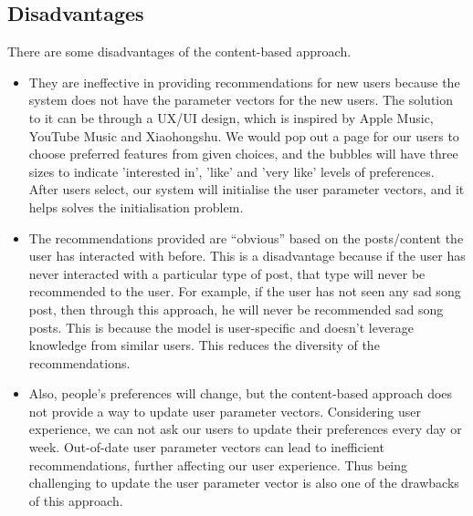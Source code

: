 \subsection*{Disadvantages}
There are some disadvantages of the content-based approach.
\begin{itemize}
\item They are ineffective in providing recommendations for new users because the system does not have the parameter vectors for the new users. 
The solution to it can be through a UX/UI design, which is inspired by Apple Music, YouTube Music and Xiaohongshu. We would pop out a page for our users to choose preferred features from given choices, and the bubbles will have three sizes to indicate 'interested in', 'like' and 'very like' levels of preferences. After users select, our system will initialise the user parameter vectors, and it helps solves the initialisation problem.%
\item The recommendations provided are “obvious” based on the posts/content the user has interacted with before. This is a disadvantage because if the user has never interacted with a particular type of post, that type will never be recommended to the user. 
For example, if the user has not seen any sad song post, then through this approach, he will never be recommended sad song posts. This is because the model is user-specific and doesn’t leverage knowledge from similar users. This reduces the diversity of the recommendations.
%
\item Also, people's preferences will change, but the content-based approach does not provide a way to update user parameter vectors. Considering user experience, we can not ask our users to update their preferences every day or week. Out-of-date user parameter vectors can lead to inefficient recommendations, further affecting our user experience. Thus being challenging to update the user parameter vector is also one of the drawbacks of this approach.
\end{itemize}



